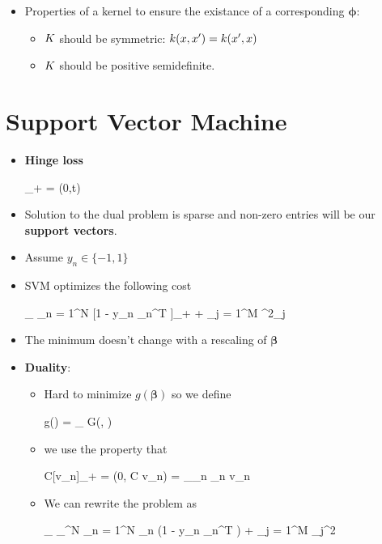 \begin{itemize}
	\item Properties of a kernel to ensure the existance of a corresponding $\bm \phi$:
	\begin{itemize}
		\item $\*K$ should be symmetric: $k(\*x, \*x') = k(\*x', \*x)$
		\item $\* K$ should be positive semidefinite.
	\end{itemize}
\end{itemize}


\section{Support Vector Machine} %
\begin{itemize}
	\item \textbf{Hinge loss}
		\begin{myalign*}
		    [t]_+ = \max(0,t)
		\end{myalign*}
	\item Solution to the dual problem is sparse and non-zero entries will be our \textbf{support vectors}.
	\item Assume $y_n \in \{-1, 1\}$
	\item SVM optimizes the following cost
	\begin{myalign*}
	    \min_{\bm \beta} \sum_{n = 1}^N [1 - y_n \tilde{\bm \phi}_n^T \bm \beta]_+ +  \sum_{j = 1}^M \beta^2_j
	\end{myalign*}
	\item The minimum doesn't change with a rescaling of $\bm \beta$
	\item \textbf{Duality}:
	\begin{itemize}
		\item Hard to minimize $g(\bm \beta)$ so we define
		\begin{myalign*}
		    g(\bm \beta) = \max_{\bm \alpha} G(\bm \beta, \bm \alpha)
		\end{myalign*}
		\item we use the property that
		\begin{myalign*}
		    C[v_n]_+ = \max(0, C v_n) = \max_{\alpha_n \in [0, C]} \alpha_n v_n
		\end{myalign*}
		\item We can rewrite the problem as
		\begin{myalign*}
		    \min_{\bm \beta} \max_{\bm \alpha \in [0, C]^N} \sum_{n = 1}^N \alpha_n (1 - y_n \tilde{\bm \phi}_n^T \bm \beta) +  \sum_{j = 1}^M \beta_j^2

\end{myalign*}
\end{itemize}
\end{itemize}
